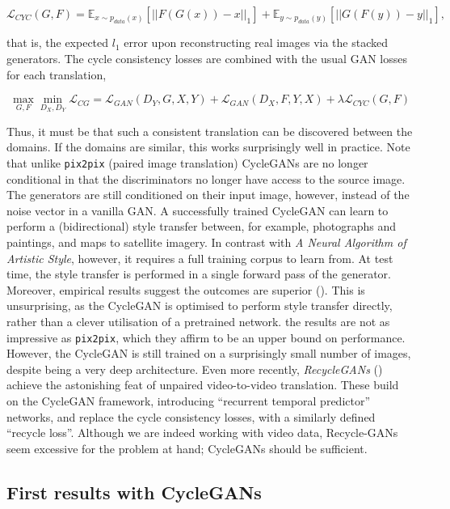 \begin{equation}
\mathcal{L}_{CYC}(G, F) = \mathbb{E}_{x \sim p_{data}(x)}[||F(G(x)) - x||_1] + \mathbb{E}_{y \sim p_{data}(y)}[||G(F(y)) - y||_1],
\end{equation}

that is, the expected $l_1$ error upon reconstructing real images via the stacked generators. The cycle consistency losses are combined with the usual GAN losses for each translation, 

\begin{equation}
\max_{G, F}\min_{D_X, D_Y} \mathcal{L}_{CG} = \mathcal{L}_{GAN}(D_Y, G, X, Y) + \mathcal{L}_{GAN}(D_X, F, Y, X) + \lambda\mathcal{L}_{CYC}(G, F)
\label{eq:cycle_gan}
\end{equation}

Thus, it must be that such a consistent translation can be discovered between the domains. If the domains are similar, this works surprisingly well in practice. Note that unlike \texttt{pix2pix} (paired image translation) CycleGANs are no longer conditional in that the discriminators no longer have access to the source image. The generators are still conditioned on their input image, however, instead of the noise vector in a vanilla GAN. A successfully trained CycleGAN can learn to perform a (bidirectional) style transfer between, for example, photographs and paintings, and maps to satellite imagery. In contrast with \emph{A Neural Algorithm of Artistic Style}, however, it requires a full training corpus to learn from. At test time, the style transfer is performed in a single forward pass of the generator. Moreover, empirical results suggest the outcomes are superior (\cite{isola2017image}). This is unsurprising, as the CycleGAN is optimised to perform style transfer directly, rather than a clever utilisation of a pretrained network. the results are not as impressive as \texttt{pix2pix}, which they affirm to be an upper bound on performance. However, the CycleGAN is still trained on a surprisingly small number of images, despite being a very deep architecture. Even more recently, \emph{RecycleGANs} (\cite{bansal2018recycle}) achieve the astonishing feat of unpaired video-to-video translation. These build on the CycleGAN framework, introducing ``recurrent temporal predictor'' networks, and replace the cycle consistency losses, with a similarly defined ``recycle loss''. Although we are indeed working with video data, Recycle-GANs seem excessive for the problem at hand; CycleGANs should be sufficient.

\subsection{First results with CycleGANs}
\label{subsec:first_results_cyclegans}

